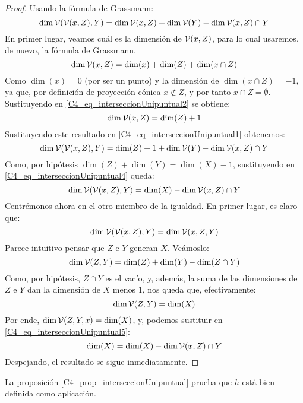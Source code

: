 \begin{proof}
	Usando la fórmula de Grassmann:
	\begin{equation}
		\label{C4_eq_interseccionUnipuntual1}
		\dim\mathcal{V}(\mathcal{V}(x,Z),Y)=\dim\mathcal{V}(x,Z)+\dim\mathcal{V}(Y)-\dim\mathcal{V}(x,Z)\cap Y
	\end{equation}
	En primer lugar, veamos cuál es la dimensión de $\mathcal{V}(x,Z)$, para lo cual usaremos, de nuevo, la fórmula de Grassmann.
	\begin{equation}
		\label{C4_eq_interseccionUnipuntual2}
		\dim\mathcal{V}(x,Z)=\dim(x)+\dim(Z)+\dim(x\cap Z)
	\end{equation}
	Como $\dim(x)=0$ (por ser un punto) y la dimensión de $\dim(x\cap Z)=-1$, ya que, por definición de proyección cónica $x\not\in Z$, y por tanto $x\cap Z=\emptyset$. Sustituyendo en \eqref{C4_eq_interseccionUnipuntual2} se obtiene:
	\begin{equation}
		\label{C4_eq_interseccionUnipuntual3}
		\dim\mathcal{V}(x,Z)=\dim(Z)+1
	\end{equation}
	Sustituyendo este resultado en \eqref{C4_eq_interseccionUnipuntual1} obtenemos:
	\begin{equation}
		\label{C4_eq_interseccionUnipuntual4}
		\dim\mathcal{V}(\mathcal{V}(x,Z),Y)=\dim(Z)+1+\dim\mathcal{V}(Y)-\dim\mathcal{V}(x,Z)\cap Y
	\end{equation}
	Como, por hipótesis $\dim(Z)+\dim(Y)=\dim(X)-1$, sustituyendo en \eqref{C4_eq_interseccionUnipuntual4} queda:
	\begin{equation}
		\label{C4_eq_interseccionUnipuntual5}
		\dim\mathcal{V}(\mathcal{V}(x,Z),Y)=\dim(X)-\dim\mathcal{V}(x,Z)\cap Y
	\end{equation}
	Centrémonos ahora en el otro miembro de la igualdad. En primer lugar, es claro que:
	\[\dim\mathcal{V}(\mathcal{V}(x,Z),Y)=\dim\mathcal{V}(x,Z,Y)\]
	Parece intuitivo pensar que $Z$ e $Y$ generan $X$. Veámoslo:
	\begin{equation}
		\label{C4_eq_interseccionUnipuntual6}
		\dim\mathcal{V}(Z,Y)=\dim(Z)+\dim(Y)-\dim(Z\cap Y)
	\end{equation}
	Como, por hipótesis, $Z\cap Y$ es el vacío, y, además, la suma de las dimensiones de $Z$ e $Y$ dan la dimensión de $X$ menos $1$, nos queda que, efectivamente:
	\begin{equation}
		\label{C4_eq_interseccionUnipuntual7}
		\dim\mathcal{V}(Z,Y)=\dim(X)
	\end{equation}
	Por ende, $\dim\mathcal{V}(Z,Y,x)=\dim(X)$, y, podemos sustituir en \eqref{C4_eq_interseccionUnipuntual5}:
	\begin{equation}
		\label{C4_eq_interseccionUnipuntual8}
		\dim(X)=\dim(X)-\dim\mathcal{V}(x,Z)\cap Y
	\end{equation}
	Despejando, el resultado se sigue inmediatamente.
\end{proof}
La proposición \ref{C4_prop_interseccionUnipuntual} prueba que $h$ está bien definida como aplicación.

